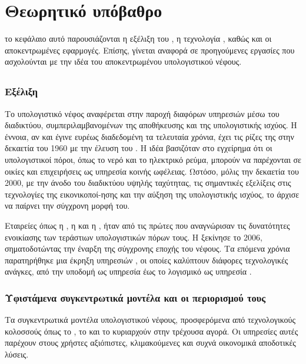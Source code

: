 \chapter{Θεωρητικό υπόβαθρο}
το κεφάλαιο αυτό παρουσιάζονται η εξέλιξη του 
, η τεχνολογία , καθώς και οι
αποκεντρωμένες εφαρμογές. Επίσης, γίνεται αναφορά σε προηγούμενες εργασίες 
που ασχολούνται με την ιδέα του αποκεντρωμένου υπολογιστικού νέφους.

\section{}
\subsection{Εξέλιξη }
Το υπολογιστικό νέφος αναφέρεται στην παροχή διαφόρων υπηρεσιών μέσω του 
διαδικτύου, συμπεριλαμβανομένων της αποθήκευσης και της υπολογιστικής ισχύος. 
Η έννοια, αν και έγινε ευρέως διαδεδομένη τα τελευταία χρόνια, έχει τις ρίζες 
της στην δεκαετία του 1960 με την έλευση του . Η ιδέα 
βασιζόταν στο εγχείρημα ότι οι υπολογιστικοί πόροι, όπως το νερό και το 
ηλεκτρικό ρεύμα, μπορούν να παρέχονται σε οικίες και επιχειρήσεις ως υπηρεσία 
κοινής ωφέλειας. Ωστόσο, μόλις την δεκαετία του 2000, με την άνοδο του 
διαδικτύου υψηλής ταχύτητας, τις σημαντικές εξελίξεις στις τεχνολογίες
της εικονικοποί-ησης  και την αύξηση της υπολογιστικής ισχύος, 
το  άρχισε να παίρνει την σύγχρονη μορφή του.

Εταιρείες όπως η , η  και η , ήταν από τις 
πρώτες που αναγνώρισαν τις δυνατότητες ενοικίασης των τεράστιων υπολογιστικών 
πόρων τους. Η  ξεκίνησε το 2006, σηματοδοτώντας 
την έναρξη της σύγχρονης εποχής του νέφους. Τα επόμενα χρόνια παρατηρήθηκε 
μια έκρηξη υπηρεσιών , οι οποίες καλύπτουν διάφορες τεχνολογικές ανάγκες, 
από την υποδομή ως υπηρεσία  έως το 
λογισμικό ως υπηρεσία .

\subsection{Υφιστάμενα συγκεντρωτικά μοντέλα και οι περιορισμού τους}
Τα συγκεντρωτικά μοντέλα υπολογιστικού νέφους, προσφερόμενα από τεχνολογικούς 
κολοσσούς όπως το , το  και το 
κυριαρχούν στην τρέχουσα αγορά. Οι υπηρεσίες αυτές παρέχουν στους χρήστες 
αξιόπιστες, κλιμακούμενες και συχνά οικονομικά αποδοτικές λύσεις. 

